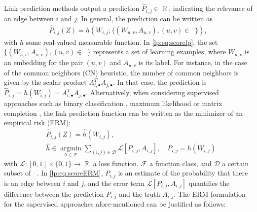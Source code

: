 \documentclass[a4paper, 11pt]{article}
\theoremstyle{remark}
\DeclareMathOperator{\argmin}{argmin}
\DeclareMathOperator{\R}{\mathbb{R}}
\DeclareMathOperator{\Dtr}{\cD_{\text{train}}}
\newcommand{\EM}{\ensuremath}
\newcommand{\cD}{\EM{\mathcal{D}}}
\newcommand{\cF}{\EM{\mathcal{F}}}
\newcommand{\cL}{\EM{\mathcal{L}}}
\begin{document}
Link prediction methods output a prediction $\hat P_{i,j} \in \R$, indicating the relevance of an edge between $i$ and $j$. In general, the prediction can be written as 
\begin{align} \label{lp:eq:scorelp}
 \hat P_{i,j}(Z) = h( W_{i,j}; \{(W_{u,v}, A_{u,v}), (u,v) \in \Dtr \}), 
\end{align}
with $h$ some real-valued measurable function. In \eqref{lp:eq:scorelp}, the set $\{(W_{u,v}, A_{u,v}), (u,v) \in \Dtr \}$ represents a set of learning examples, where $W_{u,v}$ is an embedding for the pair $(u,v)$ and $A_{u,v}$ is its label.
For instance, in the case of the common neighbors (CN) heuristic, the number of common neighbors is given by the scalar product $A_{i, \bullet}^T A_{j, \bullet}$. In that case, the prediction is $\hat P_{i,j}  = h( W_{i,j}) = A_{i, \bullet}^T A_{j, \bullet}$. 
Alternatively, when considering supervised approaches such as binary classification \citep{zhang2018link, bleakley07}, maximum likelihood  \citep{kipf2016variational, chiquet20} or matrix completion \citep{levina23, gaucher21}, the link prediction function can be written as the minimizer of an empirical risk (ERM): 
\begin{align} \label{lp:eq:scoreERM}
&\hat P_{i,j}(Z) = \hat h (W_{i,j}), \\ 
&\hat h \in  \underset{h \in \cF}{\argmin} \sum_{(i,j) \in \cD} \cL[ P_{i,j}, A_{i,j} ], \quad P_{i,j} = h(W_{i,j}) 
\end{align}
with $\cL : [0,1] \times \{0,1\} \rightarrow \R$ a loss function, $\cF$ a function class, and $\cD$ a certain subset of $\Dtr$. In \eqref{lp:eq:scoreERM}, $P_{i,j} $ is an estimate of the probability that there is an edge between $i$ and $j$, and the error term $\cL[ P_{i,j}, A_{i,j} ]$ quantifies the difference between the prediction $P_{i,j}$ and the truth $A_{i,j} $. %
The ERM formulation for the supervised approaches afore-mentioned can be justified as follows: 
\end{document}
